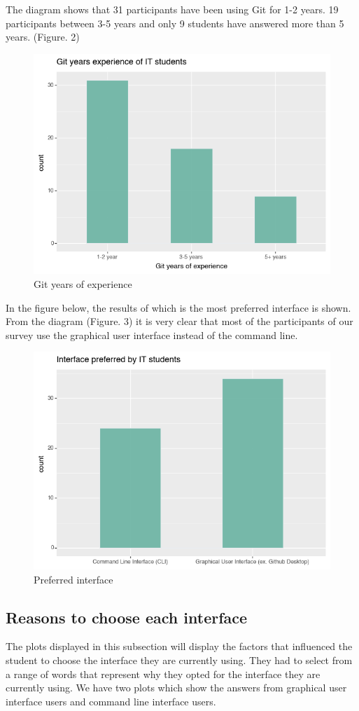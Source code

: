 \documentclass[]{report}
\begin{document}
		The diagram shows that 31 participants have been using Git for 1-2 years. 19 participants between 3-5 years and only 9 students have answered more than 5 years. (Figure. 2)
	\begin{figure}[H]
		\centering
		\includegraphics[width=0.75\linewidth]{GitYearsExperience}
		\caption{Git years of experience}
		\label{fig: 2}
	\end{figure}
	
	In the figure below, the results of which is the most preferred interface is shown. From the diagram (Figure. 3) it is very clear that most of the participants of our survey use the graphical user interface instead of the command line.
	
	
	\begin{figure}[H]
		\centering
		\includegraphics[width=0.75\linewidth]{preferredInterface}
		\caption{Preferred interface}
		\label{fig: 3}
	\end{figure}
	
	
	\subsection{Reasons to choose each interface}
	The plots displayed in this subsection will display the factors that influenced the student to choose the interface they are currently using. They had to select from a range of words that represent why they opted for the interface they are currently using. We have two plots which show the answers from graphical user interface users and command line interface users. \\
	
\end{document}
